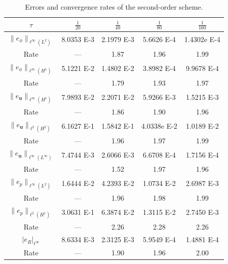 \begin{table} [!htbp] 	 
	\caption{\small Errors and convergence rates of the second-order scheme.}   \label{tab:rate:1th:2th}
	{\footnotesize\begin{tabular*}{\columnwidth}{@{\extracolsep\fill}ccccc@{\extracolsep\fill}}
		\toprule 
		$\tau $   & $\frac{1}{20}$  &  $\frac{1}{40}$   & $\frac{1}{80}$  &  $\frac{1}{160}$ \\
		\midrule 
		 {$\|e_{\phi}\|_{\ell^\infty(L^2)}$} 		&  8.0353 E-3   & 2.1979 E-3  &  5.6626 E-4   &  1.4302e E-4 \\
		Rate & 		---         & 1.87       & 1.96        & 1.99 \\
		{$\| e_{\phi}\|_{\ell^\infty(H^1)}$} 		&  5.1221 E-2  & 1.4802 E-2   &  3.8982 E-4   & 9.9678 E-4 \\
		Rate 		& ---        & 1.79        & 1.93        & 1.97 \\ 
		{$\| e_{\bm u}\|_{\ell^\infty(H^{1})}$} 		&   7.9893 E-2  &  2.2071 E-2   & 5.9266 E-3   &   1.5215 E-3 \\
		Rate 		& ---        & 1.86        & 1.90        & 1.96 \\
		{ $\|e_{\bm u}\|_{\ell^{2}(H^{2})} $ } 		& 6.1627 E-1  & 1.5842 E-1   & 4.0338e E-2   & 1.0189 E-2 \\
		Rate		& ---      & 1.96        & 1.97        & 1.99 \\ 
		{ $\|e_{\bm u}\|_{\ell^{\infty}(L^{\infty})} $ } 		& 7.4744 E-3  & 2.6066 E-3   & 6.6708 E-4   & 1.7156 E-4 \\
		Rate		& ---      & 1.52        & 1.97        & 1.96 \\ 
		$\|e_{p}\|_{\ell^{\infty}(L^{2})}$		& 1.6444 E-2  &  4.2393 E-2  & 1.0734 E-2  &   2.6987 E-3 \\
		Rate		& ---      & 1.96        & 1.98        & 1.99 \\ 
		$\|e_{p}\|_{\ell^2(H^1)}$		& 3.0631 E-1  & 6.3874 E-2  & 1.3115 E-2  &  2.7450 E-3 \\
		Rate		& ---      & 2.26        & 2.28        & 2.26 \\ 
		{$|e_R|_{\ell^{\infty}}$} 		& 8.6334 E-3  &  2.3125 E-3   & 5.9549 E-4   & 1.4881 E-4 \\
		Rate 		& ---       & 1.90        & 1.96       & 2.00 \\   
		\bottomrule
	\end{tabular*}}
	  \vspace{-8pt}
\end{table}

